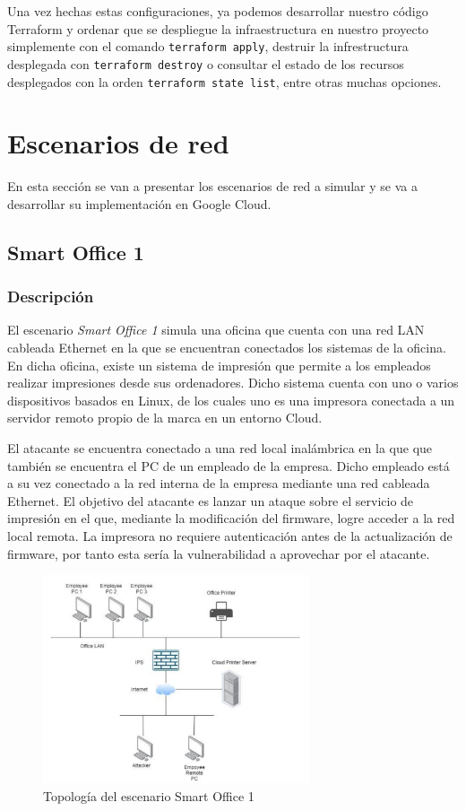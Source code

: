   Una vez hechas estas configuraciones, ya podemos desarrollar nuestro código Terraform y ordenar que se despliegue la infraestructura en nuestro proyecto simplemente con el comando \texttt{terraform apply}, destruir la infrestructura desplegada con \texttt{terraform destroy} o consultar el estado de los recursos desplegados con la orden \texttt{terraform state list}, entre otras muchas opciones.


\clearpage 
\section{Escenarios de red} \label{sec:scen}
  En esta sección se van a presentar los escenarios de red a simular y se va a desarrollar su implementación en Google Cloud. 

\subsection{Smart Office 1} \label{sec:so1}
\subsubsection{Descripción}
  El escenario \textit{Smart Office 1} simula una oficina que cuenta con una red LAN cableada Ethernet en la que se encuentran conectados los sistemas de la oficina. En dicha oficina, existe un sistema de impresión que permite a los empleados realizar impresiones desde sus ordenadores. Dicho sistema cuenta con uno o varios dispositivos basados en Linux, de los cuales uno es una impresora conectada a un servidor remoto propio de la marca en un entorno Cloud.

  El atacante se encuentra conectado a una red local inalámbrica en la que que también se encuentra el PC de un empleado de la empresa. Dicho empleado está a su vez conectado a la red interna de la empresa mediante una red cableada Ethernet. El objetivo del atacante es lanzar un ataque sobre el servicio de impresión en el que, mediante la modificación del firmware, logre acceder a la red local remota. La impresora no requiere autenticación antes de la actualización de firmware, por tanto esta sería la vulnerabilidad a aprovechar por el atacante.

  \begin{figure}[h]
  \centering
  \includegraphics[width=0.7\textwidth]{../imgs/desarrollo/escenarios-de-red/smart-office-1/smart-office-1.png}
  \caption{Topología del escenario Smart Office 1}
  \label{fig:so1-t}
  \end{figure}

